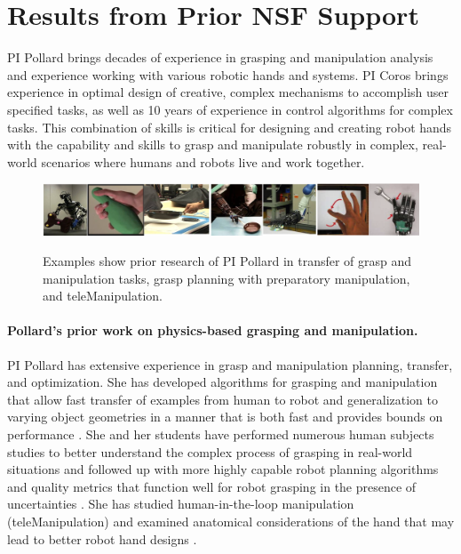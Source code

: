 \section{Results from Prior NSF Support}

PI Pollard brings decades of experience in grasping and manipulation analysis and experience working with various robotic hands and systems.   PI Coros brings experience in optimal design of creative, complex mechanisms to accomplish user specified tasks, as well as 10 years of experience in control algorithms for complex tasks.     This combination of skills is critical for designing and creating robot hands with the capability and skills to grasp and manipulate robustly in complex, real-world scenarios where humans and robots live and work together.

\begin{figure}
\begin{center}
{\includegraphics[width=\linewidth]{./figs/nspPrior}}
\end{center}
\caption{Examples show prior research of PI Pollard in transfer of grasp and manipulation tasks, grasp planning with preparatory manipulation, and teleManipulation.}
\label{fig:nspPrior}
\end{figure}

\paragraph{Pollard's prior work on physics-based grasping and manipulation.} 
PI Pollard has extensive experience in grasp and manipulation planning, transfer, and optimization.   She has developed algorithms for grasping and manipulation that allow fast transfer of examples from human to robot and generalization to varying object geometries in a manner that is both fast and provides bounds on performance \cite{pollard2004closure,Pollard:WAFR02,pollard2005physically,Li:graspDB07}.   She and her students have performed numerous human subjects studies to better understand the complex process of grasping in real-world situations \cite{Chang:2009,Chang:JMB10,illing2014changing,liu2016annotating} and followed up with more highly capable robot planning algorithms and quality metrics that function well for robot grasping in the presence of uncertainties \cite{Chang:ICRA10,Kappler:2012,kim2013physically}.   She has studied human-in-the-loop manipulation (teleManipulation) \cite{Toh:2012,chung2015quadratic,Kim:CGA11} and examined anatomical considerations of the hand that may lead to better robot hand designs \cite{pollard2002tendon,fu2006importance,Chang:twoAxis08,Chang:CoR06,Chang:AoR06}.


